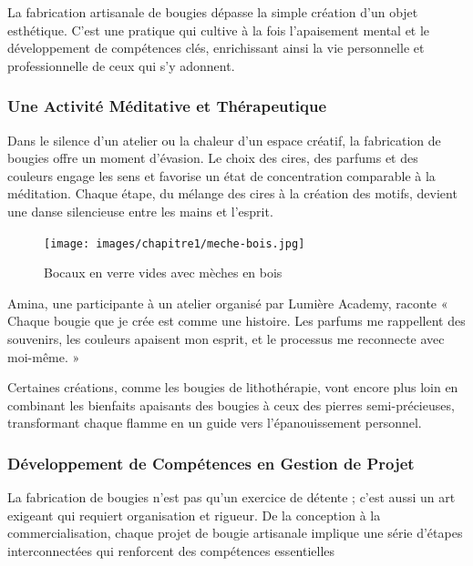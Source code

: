 \documentclass[11pt,fleqn,onecolumn,oneside]{book}
\begin{document}
\begin{remark}
La fabrication artisanale de bougies dépasse la simple création d’un objet esthétique. C’est une pratique qui cultive à la fois l’apaisement mental et le développement de compétences clés, enrichissant ainsi la vie personnelle et professionnelle de ceux qui s’y adonnent.
\end{remark}

\subsubsection*{Une Activité Méditative et Thérapeutique}

Dans le silence d’un atelier ou la chaleur d’un espace créatif, la fabrication de bougies offre un moment d’évasion. Le choix des cires, des parfums et des couleurs engage les sens et favorise un état de concentration comparable à la méditation. Chaque étape, du mélange des cires à la création des motifs, devient une danse silencieuse entre les mains et l’esprit.

\begin{figure}[htbp]
    \centering
    \texttt{[image: images/chapitre1/meche-bois.jpg]}
    \caption{Bocaux en verre vides avec mèches en bois}
    \label{fig:cedrus_atlantica}
\end{figure}

\begin{example}
Amina, une participante à un atelier organisé par Lumière Academy, raconte « Chaque bougie que je crée est comme une histoire. Les parfums me rappellent des souvenirs, les couleurs apaisent mon esprit, et le processus me reconnecte avec moi-même. »
\end{example}

Certaines créations, comme les bougies de lithothérapie, vont encore plus loin en combinant les bienfaits apaisants des bougies à ceux des pierres semi-précieuses, transformant chaque flamme en un guide vers l’épanouissement personnel.

\subsubsection*{Développement de Compétences en Gestion de Projet}

La fabrication de bougies n’est pas qu’un exercice de détente ; c’est aussi un art exigeant qui requiert organisation et rigueur. De la conception à la commercialisation, chaque projet de bougie artisanale implique une série d’étapes interconnectées qui renforcent des compétences essentielles
\end{document}
